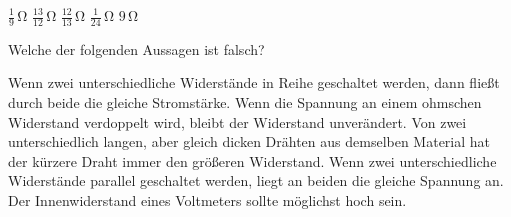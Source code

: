\documentclass[11pt]{exam}
\begin{document}
\begin{questions}
\begin{choices}
	\choice \(\mathrm{\frac{1}{9}\,\Omega}\)
	\choice \(\mathrm{\frac{13}{12}\,\Omega}\)
	\choice \(\mathrm{\frac{12}{13}\,\Omega}\)
	\choice \(\mathrm{\frac{1}{24}\,\Omega}\)
	\choice \(\mathrm{9\,\Omega}\)
\end{choices}

\vspace{3mm}\question Welche der folgenden Aussagen ist falsch?

\begin{choices}
	\choice Wenn zwei unterschiedliche Widerstände in Reihe geschaltet werden, dann fließt durch beide die gleiche Stromstärke.
	\choice Wenn die Spannung an einem ohmschen Widerstand verdoppelt wird, bleibt der Widerstand unverändert.
	\choice Von zwei unterschiedlich langen, aber gleich dicken Drähten aus demselben Material hat der kürzere Draht immer den größeren Widerstand.
	\choice Wenn zwei unterschiedliche Widerstände parallel geschaltet werden, liegt an beiden die gleiche Spannung an.
	\choice Der Innenwiderstand eines Voltmeters sollte möglichst hoch sein.
\end{choices}

\vspace{3mm}\end{questions}
\end{document}
